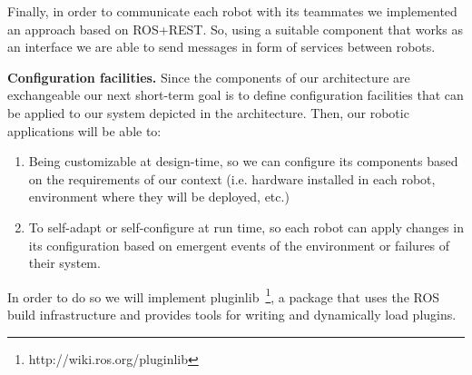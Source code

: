 Finally, in order to communicate each robot with its teammates we implemented an approach based on ROS+REST.
So, using a suitable component that works as an interface we are able to send messages in form of services between robots.

\textbf{Configuration facilities.}
Since the components of our architecture are exchangeable our next short-term goal is to define configuration facilities that can be applied to our system depicted in the architecture.
Then, our robotic applications will be able to:

\begin{enumerate}
\item Being customizable at design-time, so we can configure its components based on the requirements of our context (i.e. hardware installed in each robot, environment where they will be deployed, etc.)
\item To self-adapt or self-configure at run time, so each robot can apply changes in its configuration based on emergent events of the environment or failures of their system.
\end{enumerate}

In order to do so we will implement pluginlib~\footnote{http://wiki.ros.org/pluginlib}, a package that uses the ROS build infrastructure and provides tools for writing and dynamically load plugins.



